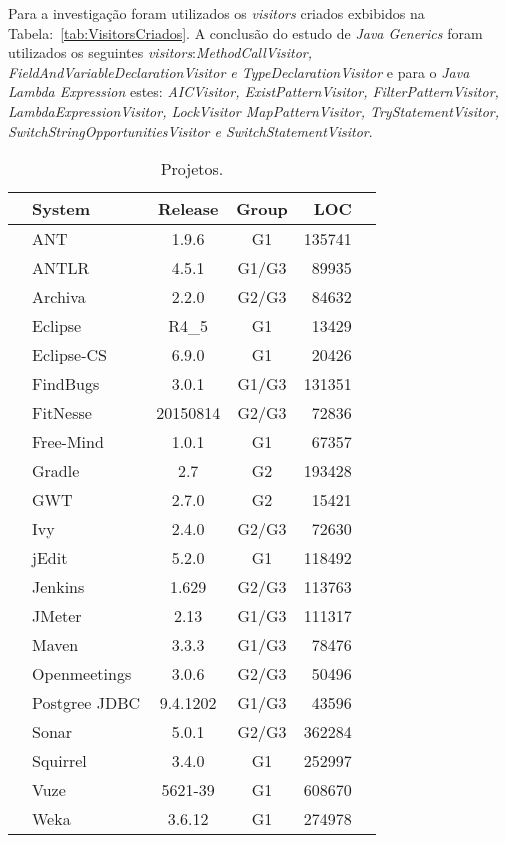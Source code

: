 Para a investigação foram utilizados os \textit{visitors} criados exbibidos na  Tabela:~\ref{tab:VisitorsCriados}. A conclusão do estudo de \textit{Java Generics} foram utilizados os seguintes \textit{visitors}:\textit{MethodCallVisitor, FieldAndVariableDeclarationVisitor e TypeDeclarationVisitor} e para o \textit{Java Lambda Expression} estes: \textit{AICVisitor, ExistPatternVisitor, FilterPatternVisitor, LambdaExpressionVisitor, LockVisitor  MapPatternVisitor, TryStatementVisitor, SwitchStringOpportunitiesVisitor e SwitchStatementVisitor}.

\newpage

  
\begin{table}[h!]\footnotesize
\centering
	\caption{Projetos.}
	\begin{tabular}{l|lccrr}\hline
		 & \textbf{System} & \textbf{Release} & \textbf{Group}  & \textbf{LOC} \\\hline \hline
		\multirow{22}{*}{\rotatebox[origin=c]{90}{\textbf{Application}}} 
																 & ANT & 1.9.6 & G1 & 135741\\
																 & ANTLR  & 4.5.1 & G1/G3 & 89935 \\
																 & Archiva  & 2.2.0 & G2/G3 & 84632\\
																 & Eclipse & R4\_5 & G1 & 13429\\
																 & Eclipse-CS & 6.9.0 & G1 & 20426\\
																 & FindBugs & 3.0.1 & G1/G3 & 131351\\
																 & FitNesse & 20150814 & G2/G3 & 72836\\
																 & Free-Mind & 1.0.1 & G1 & 67357\\
																 & Gradle & 2.7 & G2 & 193428\\
																 & GWT & 2.7.0 & G2 & 15421\\
																 & Ivy & 2.4.0 & G2/G3 & 72630\\
																 & jEdit & 5.2.0 & G1 & 118492\\
						   									     & Jenkins & 1.629 & G2/G3 & 113763\\
																 & JMeter & 2.13 & G1/G3 & 111317\\
																 & Maven & 3.3.3 & G1/G3 & 78476\\
																 & Openmeetings & 3.0.6 & G2/G3 & 50496\\
																 & Postgree JDBC & 9.4.1202 & G1/G3 & 43596\\ 
																 & Sonar & 5.0.1 & G2/G3 & 362284\\
																 & Squirrel & 3.4.0 & G1 & 252997\\
																 & Vuze & 5621-39 & G1 & 608670\\
																 & Weka & 3.6.12 & G1 & 274978\\
																 \hline
					

\end{tabular}
\end{table}
